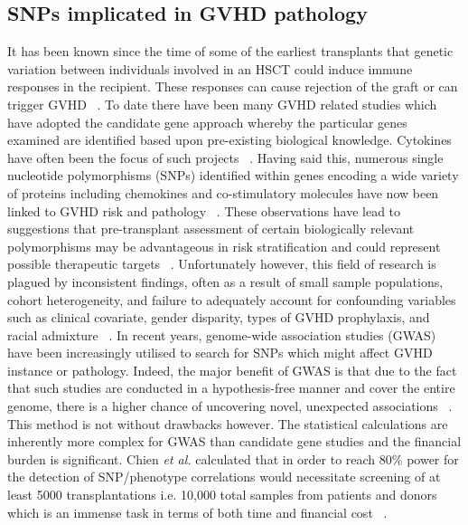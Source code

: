 \subsection{SNPs implicated in GVHD pathology}

It has been known since the time of some of the earliest transplants that genetic variation between individuals involved in an HSCT could induce immune responses in the recipient. These responses can cause rejection of the graft or can trigger GVHD ~\autocite{Han2010}. To date there have been many GVHD related studies which have adopted the candidate gene approach whereby the particular genes examined are identified based upon pre-existing biological knowledge. Cytokines have often been the focus of such projects ~\autocite{Tin2013}. Having said this, numerous single nucleotide polymorphisms (SNPs) identified within genes encoding a wide variety of proteins including chemokines and co-stimulatory molecules have now been linked to GVHD risk and pathology ~\autocite{Chi2012}. These observations have lead to suggestions that pre-transplant assessment of certain biologically relevant polymorphisms may be advantageous in risk stratification and could represent possible therapeutic targets ~\autocite{Chi2012}. Unfortunately however, this field of research is plagued by inconsistent findings, often as a result of small sample populations, cohort heterogeneity, and failure to adequately account for confounding variables such as clinical covariate, gender disparity, types of GVHD prophylaxis, and racial admixture ~\autocite{Han2010,Lin2003,Tin2013}. In recent years, genome-wide association studies (GWAS) have been increasingly utilised to search for SNPs which might affect GVHD instance or pathology. Indeed, the major benefit of GWAS is that due to the fact that such studies are conducted in a hypothesis-free manner and cover the entire genome, there is a higher chance of uncovering novel, unexpected associations ~\autocite{Tin2013}. This method is not without drawbacks however. The statistical calculations are inherently more complex for GWAS than candidate gene studies and the financial burden is significant. Chien \textit{et al.} calculated that in order to reach 80\% power for the detection of SNP/phenotype correlations would necessitate screening of at least 5000 transplantations i.e. 10,000 total samples from patients and donors which is an immense task in terms of both time and financial cost ~\autocite{Chi2012}. 

